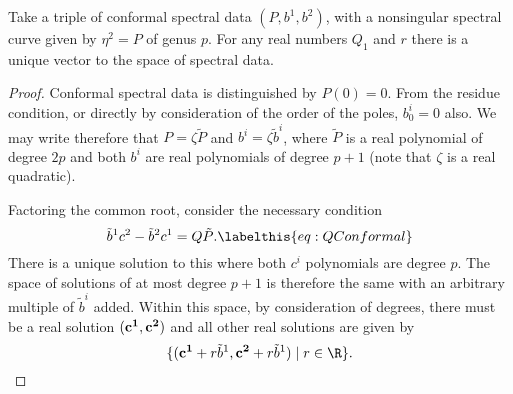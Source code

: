 \begin{lem}
Take a triple of conformal spectral data $(P,b^1,b^2)$, with a nonsingular spectral curve given by $η^2 = P$ of genus $p$. For any real numbers $Q_1$ and $r$ there is a unique vector to the space of spectral data.

\begin{proof}
Conformal spectral data is distinguished by $P(0)=0$. From the residue condition, or directly by consideration of the order of the poles, $b^i_0 = 0$ also. We may write therefore that $P= ζ\tilde{P}$ and $b^i = ζ \tilde{b}^i$, where $\tilde{P}$ is a real polynomial of degree $2p$ and both $b^i$ are real polynomials of degree $p+1$ (note that $ζ$ is a real quadratic).

Factoring the common root, consider the necessary condition
\[
\tilde{b}^1 c^2 - \tilde{b}^2 c^1 = Q\tilde{P}.\labelthis{eq:QConformal}
\]
There is a unique solution to this where both $c^i$ polynomials are degree $p$. The space of solutions of at most degree $p+1$ is therefore the same with an arbitrary multiple of $\tilde{b}^i$ added. Within this space, by consideration of degrees, there must be a real solution $(\bf c^1, \bf c^2)$ and all other real solutions are given by
\[
\{ ({\bf c^1} + r \tilde{b}^1, {\bf c^2} + r \tilde{b}^1) \mid r\in \R\}.
\]


\end{proof}
\end{lem}
